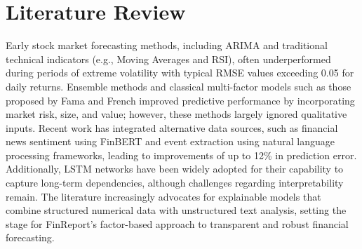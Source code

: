 \documentclass[3p,times,procedia]{elsarticle}
\begin{document}


\section{Literature Review}

Early stock market forecasting methods, including ARIMA and traditional technical indicators (e.g., Moving Averages and RSI), often underperformed during periods of extreme volatility with typical RMSE values exceeding 0.05 for daily returns. Ensemble methods and classical multi-factor models such as those proposed by Fama and French improved predictive performance by incorporating market risk, size, and value; however, these methods largely ignored qualitative inputs. Recent work has integrated alternative data sources, such as financial news sentiment using FinBERT \cite{Araci2019} and event extraction using natural language processing frameworks, leading to improvements of up to 12\% in prediction error. Additionally, LSTM networks have been widely adopted for their capability to capture long-term dependencies, although challenges regarding interpretability remain. The literature increasingly advocates for explainable models that combine structured numerical data with unstructured text analysis, setting the stage for FinReport’s factor-based approach to transparent and robust financial forecasting.
\end{document}

